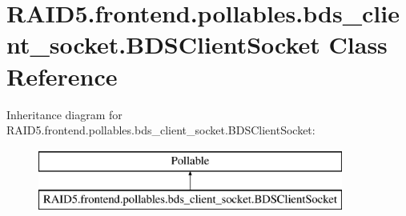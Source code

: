 \hypertarget{class_r_a_i_d5_1_1frontend_1_1pollables_1_1bds__client__socket_1_1_b_d_s_client_socket}{}\section{R\+A\+I\+D5.\+frontend.\+pollables.\+bds\+\_\+client\+\_\+socket.\+B\+D\+S\+Client\+Socket Class Reference}
\label{class_r_a_i_d5_1_1frontend_1_1pollables_1_1bds__client__socket_1_1_b_d_s_client_socket}
Inheritance diagram for R\+A\+I\+D5.\+frontend.\+pollables.\+bds\+\_\+client\+\_\+socket.\+B\+D\+S\+Client\+Socket\+:\begin{figure}[H]
\begin{center}
\leavevmode
\includegraphics[height=2.000000cm]{class_r_a_i_d5_1_1frontend_1_1pollables_1_1bds__client__socket_1_1_b_d_s_client_socket}
\end{center}
\end{figure}
